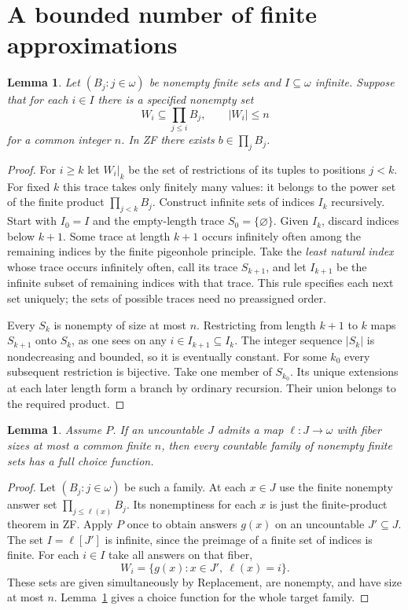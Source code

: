 \documentclass[11pt]{article}
\newtheorem{lemma}[theorem]{Lemma}
\begin{document}
\section{A bounded number of finite approximations}
\begin{lemma}\label{bound}
Let $(B_j:j\in\omega)$ be nonempty finite sets and $I\subseteq\omega$ infinite. Suppose that for each $i\in I$ there is a \emph{specified} nonempty set
\[
 W_i\subseteq\prod_{j\le i}B_j,\qquad |W_i|\le n
\]
for a common integer $n$. In ZF there exists $b\in\prod_j B_j$.
\end{lemma}
\begin{proof}
For $i\ge k$ let $W_i|_k$ be the set of restrictions of its tuples to positions $j<k$. For fixed $k$ this trace takes only finitely many values: it belongs to the power set of the finite product $\prod_{j<k} B_j$. Construct infinite sets of indices $I_k$ recursively. Start with $I_0=I$ and the empty-length trace $S_0=\{\varnothing\}$. Given $I_k$, discard indices below $k+1$. Some trace at length $k+1$ occurs infinitely often among the remaining indices by the finite pigeonhole principle. Take the \emph{least natural index} whose trace occurs infinitely often, call its trace $S_{k+1}$, and let $I_{k+1}$ be the infinite subset of remaining indices with that trace. This rule specifies each next set uniquely; the sets of possible traces need no preassigned order.

Every $S_k$ is nonempty of size at most $n$. Restricting from length $k+1$ to $k$ maps $S_{k+1}$ onto $S_k$, as one sees on any $i\in I_{k+1}\subseteq I_k$. The integer sequence $|S_k|$ is nondecreasing and bounded, so it is eventually constant. For some $k_0$ every subsequent restriction is bijective. Take one member of $S_{k_0}$. Its unique extensions at each later length form a branch by ordinary recursion. Their union belongs to the required product.
\end{proof}

\begin{lemma}\label{anchor}
Assume $P$. If an uncountable $J$ admits a map $\ell:J\to\omega$ with fiber sizes at most a common finite $n$, then \emph{every} countable family of nonempty finite sets has a full choice function.
\end{lemma}
\begin{proof}
Let $(B_j:j\in\omega)$ be such a family. At each $x\in J$ use the finite nonempty answer set $\prod_{j\le\ell(x)}B_j$. Its nonemptiness for each $x$ is just the finite-product theorem in ZF. Apply $P$ once to obtain answers $g(x)$ on an uncountable $J'\subseteq J$. The set $I=\ell[J']$ is infinite, since the preimage of a finite set of indices is finite. For each $i\in I$ take all answers on that fiber,
\[
 W_i=\{g(x):x\in J',\ \ell(x)=i\}.
\]
These sets are given simultaneously by Replacement, are nonempty, and have size at most $n$. Lemma~\ref{bound} gives a choice function for the whole target family.
\end{proof}
\end{document}
